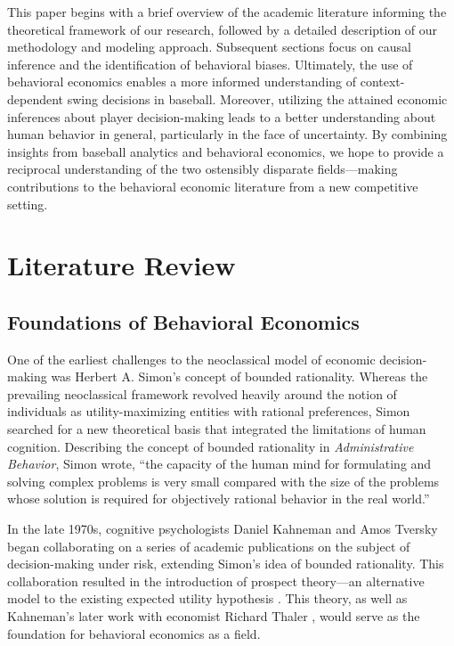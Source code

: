 \documentclass[12pt]{article}
\numberwithin{equation}{section}
\begin{document}
\vspace{5mm} %

This paper begins with a brief overview of the academic literature informing the theoretical framework of our research, followed by a detailed description of our methodology and modeling approach. Subsequent sections focus on causal inference and the identification of behavioral biases. Ultimately, the use of behavioral economics enables a more informed understanding of context-dependent swing decisions in baseball. Moreover, utilizing the attained economic inferences about player decision-making leads to a better understanding about human behavior in general, particularly in the face of uncertainty. By combining insights from baseball analytics and behavioral economics, we hope to provide a reciprocal understanding of the two ostensibly disparate fields---making contributions to the behavioral economic literature from a new competitive setting.

\section{Literature Review}

\subsection{Foundations of Behavioral Economics}

One of the earliest challenges to the neoclassical model of economic decision-making was Herbert A. Simon’s concept of bounded rationality. Whereas the prevailing neoclassical framework revolved heavily around the notion of individuals as utility-maximizing entities with rational preferences, Simon searched for a new theoretical basis that integrated the limitations of human cognition. Describing the concept of bounded rationality in \textit{Administrative Behavior}, Simon wrote, “the capacity of the human mind for formulating and solving complex problems is very small compared with the size of the problems whose solution is required for objectively rational behavior in the real world.” \parencite{simon_behavioral_1955}

\vspace{5mm} %

In the late 1970s, cognitive psychologists Daniel Kahneman and Amos Tversky began collaborating on a series of academic publications on the subject of decision-making under risk, extending Simon’s idea of bounded rationality. This collaboration resulted in the introduction of prospect theory---an alternative model to the existing expected utility hypothesis \parencite{kahneman_prospect_1979}. This theory, as well as Kahneman’s later work with economist Richard Thaler \parencite{thaler_toward_1980}, would serve as the foundation for behavioral economics as a field.
\end{document}
